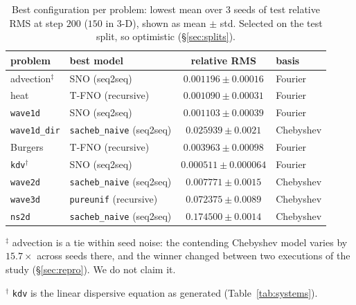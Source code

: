 \documentclass[11pt]{article}
\theoremstyle{definition}
\theoremstyle{remark}
\begin{document}
\begin{table}[htbp]
\centering
\caption{Best configuration per problem: lowest mean over 3 seeds of test
relative RMS at step $200$ ($150$ in $3$-D), shown as mean $\pm$ std. Selected on
the test split, so optimistic (\S\ref{sec:splits}).}
\label{tab:winners}
\small
\begin{tabular}{@{}llcl@{}}
\toprule
problem & best model & relative RMS & basis \\
\midrule
advection$^\ddagger$   & SNO (seq2seq)                   & $0.001196 \pm 0.00016$ & Fourier \\
heat                 & T-FNO (recursive)               & $0.001090 \pm 0.00031$ & Fourier \\
\texttt{wave1d}      & SNO (seq2seq)                   & $0.001103 \pm 0.00039$ & Fourier \\
\texttt{wave1d\_dir} & \texttt{sacheb\_naive} (seq2seq)& $0.025939 \pm 0.0021$  & Chebyshev \\
Burgers              & T-FNO (recursive)               & $0.003963 \pm 0.00098$ & Fourier \\
\texttt{kdv}$^{\dagger}$ & SNO (seq2seq)                & $0.000511 \pm 0.000064$& Fourier \\
\texttt{wave2d}      & \texttt{sacheb\_naive} (seq2seq)& $0.007771 \pm 0.0015$  & Chebyshev \\
\texttt{wave3d}      & \texttt{pureunif} (recursive)   & $0.072375 \pm 0.0089$  & Chebyshev \\
\texttt{ns2d}        & \texttt{sacheb\_naive} (seq2seq)& $0.174500 \pm 0.0014$  & Chebyshev \\
\bottomrule
\end{tabular}

\vspace{2pt}
{\footnotesize $^\ddagger$ advection is a tie within seed noise: the contending
Chebyshev model varies by $15.7\times$ across seeds there, and the winner changed
between two executions of the study (\S\ref{sec:repro}). We do not claim it.
\par $^{\dagger}$ \texttt{kdv} is the linear dispersive equation as generated
(Table~\ref{tab:systems}).}
\end{table}
\end{document}
